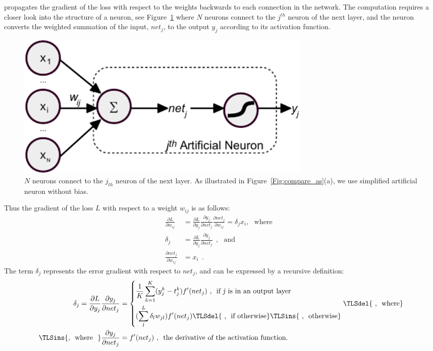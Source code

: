 \protect{}
\protect{} propagates the gradient of the loss with respect to the weights backwards to each connection in the network.
The computation requires a closer look into the structure of a neuron, see Figure~\ref{Fig:neuron_net} where $N$ neurons connect to the $j^{th}$ neuron of the next layer, and the neuron converts the weighted summation of the input, $net_j$, to the output $y_j$ according to its activation function.
\begin{figure}[bt]
	\centering
	\includegraphics[width=0.7\textwidth]{pics_iconip/neuron.pdf}
	\caption{ $N$ neurons connect to the $j_{th}$ neuron of the next layer. As illustrated in Figure~\ref{Fig:compare_as}(a), we use \protect{} simplified artificial neuron without bias.}
	\label{Fig:neuron_net}
\end{figure}
Thus the gradient of the loss $L$ with respect to a weight $w_{ij}$ is as follows:
\begin{equation}
\begin{aligned}
\frac{\partial L}{\partial w_{ij}} &= \frac{\partial L}{\partial y_j} \frac{\partial y_j}{\partial net_j} \frac{\partial net_j}{\partial w_{ij}} = \delta_j x_i , \textrm{~~where~~}\\
 \delta_j &=  \frac{\partial L}{\partial y_j} \frac{\partial y_j}{\partial net_j}~~,  \textrm{~~and~~}\\
\frac{\partial net_j}{\partial w_{ij}} &= x_i~~.
\end{aligned}
\end{equation}
The term $ \delta_j $ represents the error gradient with respect to $net_j$, and can be expressed by a recursive definition:
\begin{equation}
\begin{aligned}
\delta_j =  \frac{\partial L}{\partial y_j} \frac{\partial y_j}{\partial net_j} &= \left\{
\begin{aligned}
&\frac{1}{K}\sum_{k=1}^K (y^{k}_{j}-t^{k}_{j}) f'(net_j)  \textrm{~,~~if \textit{j} is in an output layer} \\
&(\sum_l^L \delta_l w_{jl}) f'(net_j)  \protect\TLSdel{\textrm{~,~~if otherwise}}  \protect\TLSins{\textrm{~,~~otherwise}}
\end{aligned}
\right. \protect\TLSdel{\textrm{~,~~where}} \\\protect\TLSins{
\textrm{,~~where~~}} \frac{\partial y_j}{\partial net_j} &=  f'(net_j) \textrm{~,~~the derivative of the activation function}.
\end{aligned}
\label{equ:derivative}
\end{equation}
